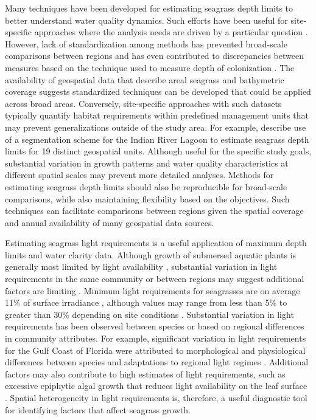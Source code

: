 \documentclass[letterpaper,12pt,oneside]{article}\usepackage[]{graphicx}\usepackage[]{color}
\begin{document}
Many techniques have been developed for estimating seagrass depth limits to better understand water quality dynamics.  Such efforts have been useful for site-specific approaches where the analysis needs are driven by a particular question \citep[e.g.,][]{Iverson86,Hale04}. However, lack of standardization among methods has prevented broad-scale comparisons between regions and has even contributed to discrepancies between measures based on the technique used to measure depth of colonization \citep{Spears09}.  The availability of geospatial data that describe areal seagrass and bathymetric coverage suggests standardized techniques can be developed that could be applied across broad areas.  Conversely, site-specific approaches with such datasets typically quantify habitat requirements within predefined management units that may prevent generalizations outside of the study area. For example, \cite{Steward05} describe use of a segmentation scheme for the Indian River Lagoon to estimate seagrass depth limits for 19 distinct geospatial units.  Although useful for the specific study goals, substantial variation in growth patterns and water quality characteristics at different spatial scales may prevent more detailed analyses.  Methods for estimating seagrass depth limits should also be reproducible for broad-scale comparisons, while also maintaining flexibility based on the objectives. Such techniques can facilitate comparisons between regions given the spatial coverage and annual availability of many geospatial data sources.  

Estimating seagrass light requirements is a useful application of maximum depth limits and water clarity data.  Although growth of submersed aquatic plants is generally most limited by light availability \citep{Barko82,Hall90,Dennison93}, substantial variation in light requirements in the same community or between regions may suggest additional factors are limiting \citep{Dennison93,Choice14}.  Minimum light requirements for seagrasses are on average 11\% of surface irradiance \citep{Duarte91}, although values may range from less than 5\% to greater than 30\% depending on site conditions \citep{Dennison93}. Substantial variation in light requirements has been observed between species or based on regional differences in community attributes.  For example, significant variation in light requirements for the Gulf Coast of Florida were attributed to morphological and physiological differences between species and adaptations to regional light regimes \citep{Choice14}. Additional factors may also contribute to high estimates of light requirements, such as excessive epiphytic algal growth that reduces light availability on the leaf surface \citep{Kemp04}. Spatial heterogeneity in light requirements is, therefore, a useful diagnostic tool for identifying factors that affect seagrass growth. 
\end{document}
